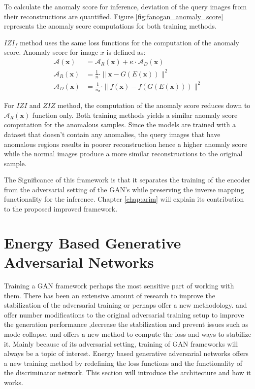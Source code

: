 To calculate the anomaly score for inference, deviation of the query images from their
reconstructions are quantified. Figure \ref{fig:fanogan_anomaly_score} represents the anomaly score
computations for both training methods.

 $IZI_f$ method uses the same loss functions for the computation of the anomaly score. Anomaly score
 for image $x$ is defined as:
\begin{align}
	\mathcal{A}(\mathbf{x})&=\mathcal{A}_{R}(\mathbf{x})+\kappa \cdot \mathcal{A}_{D}(\mathbf{x}) \\[5pt]
	\mathcal{A}_{R}(\mathbf{x})&=\frac{1}{n} \cdot\|\mathbf{x}-G(E(\mathbf{x}))\|^{2} \\[5pt]
	\mathcal{A}_{D}(\mathbf{x})&=\frac{1}{n_{d}} \cdot\|f(\mathbf{x})-f(G(E(\mathbf{x})))\|^{2}
\end{align}

For $IZI$ and $ZIZ$ method, the computation of the anomaly score reduces down to
$\mathcal{A}_{R}(\mathbf{x})$ function only. Both training methods yields a similar anomaly score
computation for the anomalous samples. Since the models are trained with a dataset that doesn't
contain any anomalies, the query images that have anomalous regions results in poorer reconstruction
hence a higher anomaly score while the normal images produce a more similar reconstructions to the
original sample. 

The Significance of this framework is that it separates the training of the encoder from the
adversarial setting of the GAN's while preserving the inverse mapping functionality for the
inference. Chapter \ref{chap:arim} will explain its contribution to the proposed improved framework.

\section{Energy Based Generative Adversarial Networks}
\label{sec:ebgan}

Training a GAN framework perhaps the most sensitive part of working with them. There has been an
extensive amount of research to improve the stabilization of the adversarial training or perhaps
offer a new methodology. \cite{fm} and \cite{methods} offer number modifications to the original
adversarial training setup to improve the generation performance ,decrease the stabilization and
prevent issues such as mode collapse\footnotemark. \cite{Arjovsky2017WassersteinG} and
\cite{Gulrajani2017ImprovedTO} offers a new method to compute the loss and ways to stabilize it.
Mainly because of its adversarial setting, training of GAN frameworks will always be a topic of
interest. Energy based generative adversarial networks \cite{Zhao2016EnergybasedGA} offers a new
training method by redefining the loss functions and the functionality of the discriminator network.
This section will introduce the architecture and how it works.

